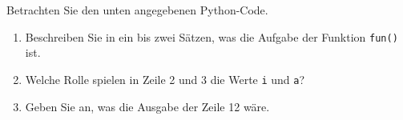 Betrachten Sie den unten angegebenen Python-Code.
\begin{enumerate}
	\item Beschreiben Sie in ein bis zwei Sätzen, was die Aufgabe der Funktion \verb|fun()| ist.
	\item Welche Rolle spielen in Zeile 2 und 3 die Werte \verb|i| und \verb|a|?
	\item Geben Sie an, was die Ausgabe der Zeile 12 wäre.
\end{enumerate}

